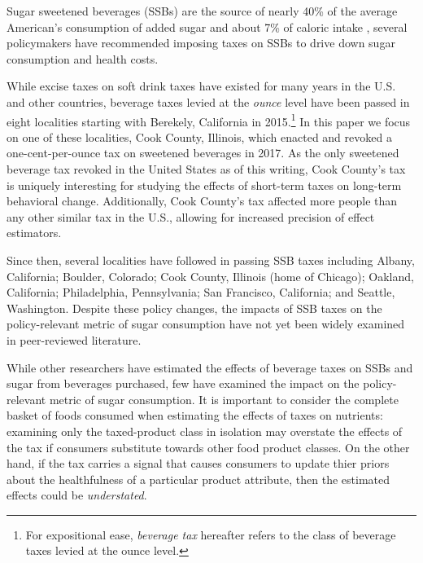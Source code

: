 \documentclass[12pt]{article}
\begin{document}
Sugar sweetened beverages (SSBs) are the source of nearly 40\% of the average American's consumption of added sugar \parencite{dietary2015dietary} and about 7\% of caloric intake \parencite{allcott2019should}, several policymakers have recommended imposing taxes on SSBs to drive down sugar consumption and health costs.

While excise taxes on soft drink taxes have existed for many years in the U.S. and other countries, beverage taxes levied at the \textit{ounce} level have been passed in eight localities starting with Berekely, California in 2015.\footnote{For expositional ease, \textit{beverage tax} hereafter refers to the class of beverage taxes levied at the ounce level.} In this paper we focus on one of these localities, Cook County, Illinois, which enacted and revoked a one-cent-per-ounce tax on sweetened beverages in 2017. As the only sweetened beverage tax revoked in the United States as of this writing, Cook County's tax is uniquely interesting for studying the effects of short-term taxes on long-term behavioral change. Additionally, Cook County's tax affected more people than any other similar tax in the U.S., allowing for increased precision of effect estimators.

Since then, several localities have followed in passing SSB taxes including Albany, California; Boulder, Colorado; Cook County, Illinois (home of Chicago); Oakland, California; Philadelphia, Pennsylvania; San Francisco, California; and Seattle, Washington. Despite these policy changes, the impacts of SSB taxes on the policy-relevant metric of sugar consumption have not yet been widely examined in peer-reviewed literature.

While other researchers have estimated the effects of beverage taxes on SSBs and sugar from beverages purchased, few have examined the impact on the policy-relevant metric of sugar consumption. It is important to consider the complete basket of foods consumed when estimating the effects of taxes on nutrients: examining only the taxed-product class in isolation may overstate the effects of the tax if consumers substitute towards other food product classes. On the other hand, if the tax carries a signal that causes consumers to update thier priors about the healthfulness of a particular product attribute, then the estimated effects could be \textit{understated}.
\end{document}
